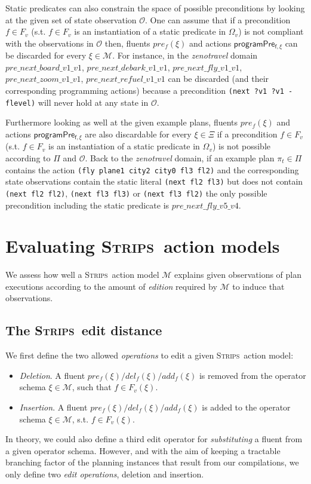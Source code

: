 \documentclass[3p,times]{elsarticle}
\newcommand{\strips}{\textsc{Strips}}     %
\begin{document}
Static predicates can also constrain the space of possible preconditions by looking at the given set of state observation $\mathcal{O}$. One can assume that if a precondition $f\in F_v$ (s.t. $f\in F_v$ is an instantiation of a static predicate in $\Omega_v$) is not compliant with the observations in $\mathcal{O}$ then, fluents $pre_f(\xi)$ and actions $\mathsf{programPre_{f,\xi}}$ can be discarded for every $\xi\in\mathcal{M}$. For instance, in the {\em zenotravel} domain $pre\_next\_board\_v1\_v1$, $pre\_next\_debark\_v1\_v1$, $pre\_next\_fly\_v1\_v1$, $pre\_next\_zoom\_v1\_v1$, $pre\_next\_refuel\_v1\_v1$ can be discarded (and their corresponding programming actions) because a precondition {\tt\small(next ?v1 ?v1 - flevel)} will never hold at any state in $\mathcal{O}$.

Furthermore looking as well at the given example plans, fluents $pre_f(\xi)$ and actions $\mathsf{programPre_{f,\xi}}$ are also discardable for every $\xi\in\Xi$ if a precondition $f\in F_v$ (s.t. $f\in F_v$ is an instantiation of a static predicate in $\Omega_v$) is not possible according to $\Pi$ and $\mathcal{O}$. Back to the {\em zenotravel} domain, if an example plan $\pi_t\in \Pi$ contains the action {\tt\small (fly plane1 city2 city0 fl3 fl2)} and the corresponding state observations contain the static literal {\tt\small (next fl2 fl3)} but does not contain {\tt\small (next fl2 fl2)}, {\tt\small (next fl3 fl3)} or {\tt\small (next fl3 fl2)} the only possible precondition including the static predicate is $pre\_next\_fly\_v5\_v4$.



\section{Evaluating \strips\ action models}
\label{sec:Section6}
We assess how well a \strips\ action model $\mathcal{M}$ explains given observations of plan executions according to the amount of {\em edition} required by $\mathcal{M}$ to induce that observations. %

\subsection{The \strips\ edit distance}

We first define the two allowed \emph{operations} to edit a given \strips\ action model:
\begin{itemize}
\item {\em Deletion}. A fluent $pre_f(\xi)/del_f(\xi)/add_f(\xi)$ is removed from the operator schema $\xi\in\mathcal{M}$, such that $f\in F_v(\xi)$.
\item {\em Insertion}. A fluent $pre_f(\xi)/del_f(\xi)/add_f(\xi)$ is added to the operator schema $\xi\in\mathcal{M}$, s.t. $f\in F_v(\xi)$.
\end{itemize}
In theory, we could also define a third edit operator for {\em substituting} a fluent from a given operator schema. However, and with the aim of keeping a tractable branching factor of the planning instances that result from our compilations, we only define two {\em edit operations}, deletion and insertion.
\end{document}
